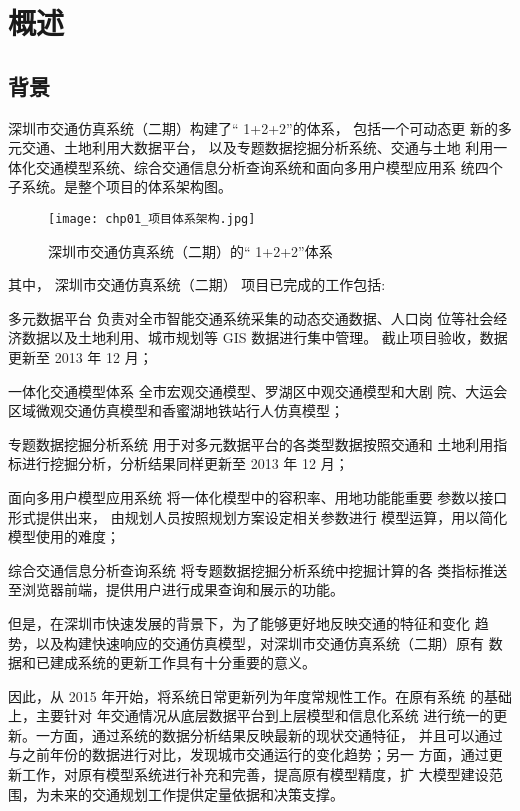 

\chapter{概述}

\section{背景} 
深圳市交通仿真系统（二期）构建了“ 1+2+2”的体系， 包括一个可动态更
新的多元交通、土地利用大数据平台， 以及专题数据挖掘分析系统、交通与土地
利用一体化交通模型系统、综合交通信息分析查询系统和面向多用户模型应用系
统四个子系统。是整个项目的体系架构图。

\begin{figure}[!hbt]
  \centering
  \texttt{[image: chp01\_项目体系架构.jpg]}
  \caption{深圳市交通仿真系统（二期）的“ 1+2+2”体系\label{fig:项目体系架构}}
\end{figure}

其中， 深圳市交通仿真系统（二期） 项目已完成的工作包括:

\begin{para}
\item[多元数据平台] 负责对全市智能交通系统采集的动态交通数据、人口岗
位等社会经济数据以及土地利用、城市规划等 GIS 数据进行集中管理。
截止项目验收，数据更新至 2013 年 12 月；
\item[一体化交通模型体系] 全市宏观交通模型、罗湖区中观交通模型和大剧
院、大运会区域微观交通仿真模型和香蜜湖地铁站行人仿真模型；
\item[专题数据挖掘分析系统] 用于对多元数据平台的各类型数据按照交通和
土地利用指标进行挖掘分析，分析结果同样更新至 2013 年 12 月；
\item[面向多用户模型应用系统] 将一体化模型中的容积率、用地功能能重要
参数以接口形式提供出来， 由规划人员按照规划方案设定相关参数进行
模型运算，用以简化模型使用的难度；
\item[综合交通信息分析查询系统] 将专题数据挖掘分析系统中挖掘计算的各
类指标推送至浏览器前端，提供用户进行成果查询和展示的功能。
\end{para}

但是，在深圳市快速发展的背景下，为了能够更好地反映交通的特征和变化
趋势，以及构建快速响应的交通仿真模型，对深圳市交通仿真系统（二期）原有
数据和已建成系统的更新工作具有十分重要的意义。

因此，从 2015 年开始，将系统日常更新列为年度常规性工作。在原有系统
的基础上，主要针对 \pyear 年交通情况从底层数据平台到上层模型和信息化系统
进行统一的更新。一方面，通过系统的数据分析结果反映最新的现状交通特征，
并且可以通过与之前年份的数据进行对比，发现城市交通运行的变化趋势；另一
方面，通过更新工作，对原有模型系统进行补充和完善，提高原有模型精度，扩
大模型建设范围，为未来的交通规划工作提供定量依据和决策支撑。

